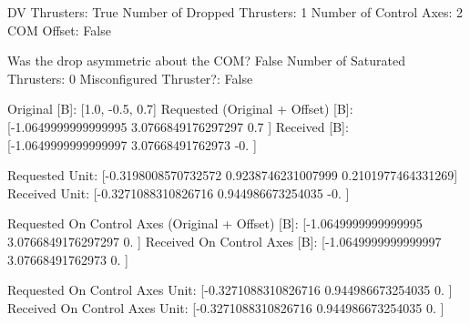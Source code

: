 DV Thrusters:	True
Number of Dropped Thrusters:	1
Number of Control Axes:	2
COM Offset:	False

Was the drop asymmetric about the COM?	False
Number of Saturated Thrusters:	0
Misconfigured Thruster?:	False

Original [B]:	[1.0, -0.5, 0.7]
Requested (Original + Offset) [B]:	[-1.0649999999999995  3.0766849176297297  0.7               ]
Received [B]:		[-1.0649999999999997  3.07668491762973   -0.                ]

Requested Unit:		[-0.3198008570732572  0.9238746231007999  0.2101977464331269]
Received Unit:		[-0.3271088310826716  0.944986673254035  -0.                ]

Requested On Control Axes (Original + Offset) [B]:	[-1.0649999999999995  3.0766849176297297  0.                ]
Received On Control Axes [B]:		[-1.0649999999999997  3.07668491762973    0.                ]

Requested On Control Axes Unit:		[-0.3271088310826716  0.944986673254035   0.                ]
Received On Control Axes Unit:		[-0.3271088310826716  0.944986673254035   0.                ]

